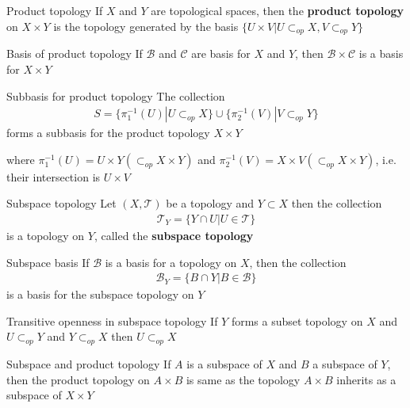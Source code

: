 \documentclass[titlepage, 12pt]{book}
\begin{document}
\begin{definition}{Product topology}{}
    If $X$ and $Y$ are topological spaces, then the \textbf{product topology} on
    $X\times Y$ is the topology generated by the basis $\{U\times V |
    U\subset_{op} X, V\subset_{op} Y\}$
\end{definition}

\begin{theorem}{Basis of product topology}{}
    If $\mathcal{B}$ and $\mathcal{C}$ are basis for $X$ and $Y$, then
    $\mathcal{B}\times\mathcal{C}$ is a basis for $X\times Y$
\end{theorem}

\begin{theorem}{Subbasis for product topology}{}
    The collection
    \begin{align*}
        S = \{\pi_1^{-1}(U) | U\subset_{op}X\}\cup \{\pi_2^{-1}(V) |
        V\subset_{op} Y\}
    \end{align*}
    forms a subbasis for the product topology $X\times Y$
\end{theorem}
where $\pi_1^{-1}(U) = U\times Y (\subset_{op} X\times Y)$ and $\pi_2^{-1}(V) =
X\times V (\subset_{op} X\times Y)$, i.e. their intersection is $U\times V$

\begin{definition}{Subspace topology}{}
    Let $(X, \mathcal{T})$ be a topology and $Y\subset X$ then the collection
    \begin{align*}
        \mathcal{T}_Y = \{Y\cap U | U\in\mathcal{T}\}
    \end{align*}
    is a topology on $Y$, called the \textbf{subspace topology}
\end{definition}

\begin{theorem}{Subspace basis}{}
    If $\mathcal{B}$ is a basis for a topology on $X$, then the collection
    \begin{align*}
        \mathcal{B}_Y = \{B\cap Y | B\in\mathcal{B}\}
    \end{align*}
    is a basis for the subspace topology on $Y$
\end{theorem}

\begin{theorem}{Transitive openness in subspace topology}{}
    If $Y$ forms a subset topology on $X$ and $U\subset_{op}Y$ and
    $Y\subset_{op}X$ then $U\subset_{op} X$
\end{theorem}

\begin{theorem}{Subspace and product topology}{}
    If $A$ is a subspace of $X$ and $B$ a subspace of $Y$, then the product
    topology on $A\times B$ is same as the topology $A\times B$ inherits as a
    subspace of $X\times Y$
\end{theorem}
\end{document}
